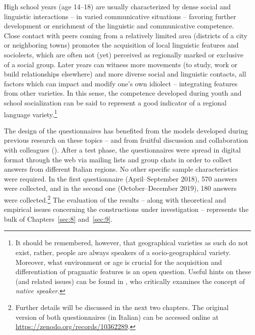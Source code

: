 High school years (age 14–18) are usually characterized by dense social and linguistic interactions – in varied communicative situations – favoring further development or enrichment of the linguistic and communicative competence. Close contact with peers coming from a relatively limited area (districts of a city or neighboring towns) promotes the acquisition of local linguistic features and sociolects, which are often not (yet) perceived as regionally marked or exclusive of a social group. Later years can witness more movements (to study, work or build relationships elsewhere) and more diverse social and linguistic contacts, all factors which can impact and modify one’s own idiolect – integrating features from other varieties. In this sense, the competence developed during youth and school socialization can be said to represent a good indicator of a regional language variety.\footnote{It should be remembered, however, that geographical varieties as such do not exist, rather, people are always speakers of a socio-geographical variety. Moreover, what environment or age is crucial for the acquisition and differentiation of pragmatic features is an open question. Useful hints on these (and related issues) can be found in \citet{Berruto2003}, who critically examines the concept of \textit{native speaker}.}

The design of the questionnaires has benefited from the models developed during previous research on these topics \citep{Favaro2019} – and from fruitful discussion and collaboration with colleagues (\citealt{FavaroGoria2019}). After a test phase, the questionnaires were spread in digital format through the web via mailing lists and group chats in order to collect answers from different Italian regions. No other specific sample characteristics were required. In the first questionnaire (April–September 2018), 570 answers were collected, and in the second one (October–December 2019), 180 answers were collected.\footnote{Further details will be discussed in the next two chapters. The original version of both questionnaires (in Italian) can be accessed online at \url{https://zenodo.org/records/10362289}.} The evaluation of the results – along with theoretical and empirical issues concerning the constructions under investigation – represents the bulk of Chapters~\ref{sec:8} and~\ref{sec:9}.

